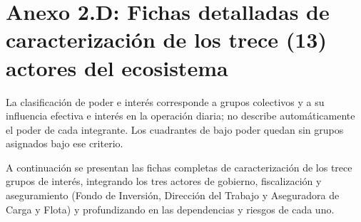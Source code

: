 \clearpage

\section*{Anexo 2.D: Fichas detalladas de caracterización de los trece (13) actores del ecosistema}\label{sec:2-anexo-2d}

La clasificación de poder e interés corresponde a grupos colectivos y a su influencia efectiva e interés en la operación diaria; no describe automáticamente el poder de cada integrante. Los cuadrantes de bajo poder quedan sin grupos asignados bajo ese criterio.

A continuación se presentan las fichas completas de caracterización de los trece grupos de interés, integrando los tres actores de gobierno, fiscalización y aseguramiento (Fondo de Inversión, Dirección del Trabajo y Aseguradora de Carga y Flota) y profundizando en las dependencias y riesgos de cada uno.

